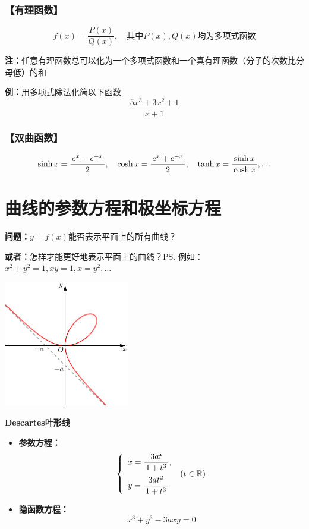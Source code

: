 \subsubsection{【有理函数】}

$$f(x)=\frac{P(x)}{Q(x)}, \quad\mbox{其中}P(x),Q(x)\mbox{均为多项式函数}$$
  
{\bf 注：}任意有理函数总可以化为一个多项式函数和一个真有理函数（分子的次数比分母低）的和
	  
{{\bf 例：}用多项式除法化简以下函数}
$$\frac{5x^3+3x^2+1}{x+1}$$

\subsubsection{【双曲函数】}

{\small $$\sinh x =\displaystyle\frac{\,{e^x-e^{-x}}\,}{\,{2}\,}, \quad
\cosh x =\displaystyle\frac{\,{e^x+e^{-x}}\,}{\,{2}\,}, \quad\tanh x=\displaystyle\frac{\,{\sinh
x}\,}{\,{\cosh x}\,}, \ldots$$}

\section{曲线的参数方程和极坐标方程}

{\bf 问题：}$y=f(x)$能否表示平面上的所有曲线？
	
{\bf 或者：}怎样才能更好地表示平面上的曲线？\ps{例如：$x^2+y^2=1,xy=1,x=y^2,\ldots$}

\begin{shaded}
	\begin{center}
		\includegraphics[width=5.5cm]{./images/ch1/dicartesCurve.pdf}

		{\bf Descartes叶形线}
	\end{center}
	\bigskip
	\begin{itemize}
	  \item {\bf 参数方程：}
	  	$$\left\{\begin{array}{l}
	  		x=\displaystyle\frac{\,{3at}\,}{\,{1+t^3}\,},\\[1em] y=\displaystyle\frac{\,{3at^2}\,}{\,{1+t^3}\,}
	  	\end{array}\right.\;(t\in\mathbb{R})$$
	  	\vspace{-1em}
	  \item {\bf 隐函数方程：}
	  	$$x^3+y^3-3axy=0$$
	\end{itemize}
\end{shaded}

